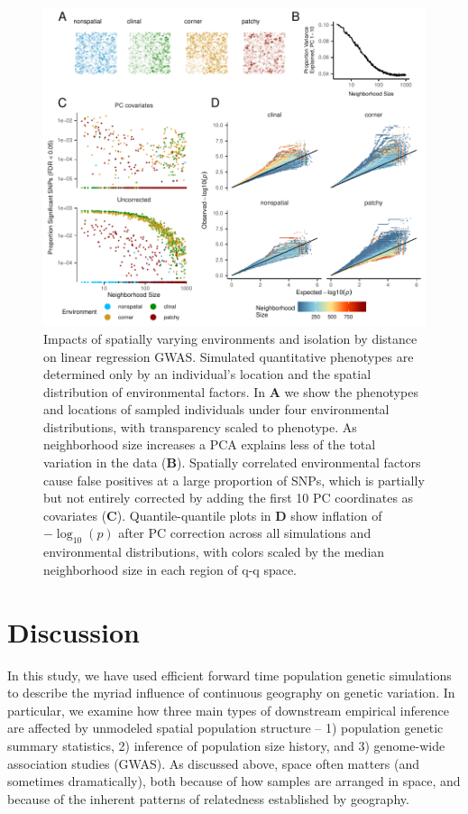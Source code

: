 \documentclass[10pt,twoside,lineno,hidelinks]{preprint}
\begin{document}
\begin{figure}[p]
\centering
\includegraphics[width=\textwidth]{figures/gwas_summary_loglog.pdf}
    \caption{Impacts of spatially varying environments and isolation by distance on linear regression GWAS. Simulated quantitative phenotypes are determined only by an individual's location and the spatial distribution of environmental factors. In \textbf{A} we show the phenotypes and locations of sampled individuals under four environmental distributions, with transparency scaled to phenotype. As neighborhood size increases a PCA explains less of the total variation in the data (\textbf{B}). Spatially correlated environmental factors cause false positives at a large proportion of SNPs, which is partially but not entirely corrected by adding the first 10 PC coordinates as covariates (\textbf{C}). Quantile-quantile plots in \textbf{D} show inflation of $-\log_{10}(p)$ after PC correction across all simulations and environmental distributions, with colors scaled by the median neighborhood size in each region of q-q space.
}
\label{fig:gwas}
\end{figure}

\section{Discussion}

In this study,
we have used efficient forward time population genetic simulations 
to describe the myriad influence of continuous geography on genetic variation. 
In particular, we examine how three main types of downstream empirical inference are affected by unmodeled spatial population structure
-- 1) population genetic summary statistics, 2) inference of population size history, and 3) genome-wide association studies (GWAS). 
As discussed above, 
space often matters (and sometimes dramatically),
both because of how samples are arranged in space, and because of the inherent patterns of relatedness established by geography.
\end{document}
